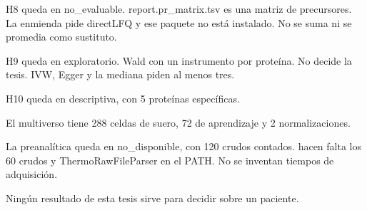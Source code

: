 H8 queda en no\_evaluable. report.pr\_matrix.tsv es una matriz de precursores. La enmienda pide directLFQ y ese paquete no está instalado. No se suma ni se promedia como sustituto.

H9 queda en exploratorio. Wald con un instrumento por proteína. No decide la tesis. IVW, Egger y la mediana piden al menos tres.

H10 queda en descriptiva, con 5 proteínas específicas.

El multiverso tiene 288 celdas de suero, 72 de aprendizaje y 2 normalizaciones.

La preanalítica queda en no\_disponible, con 120 crudos contados. hacen falta los 60 crudos y ThermoRawFileParser en el PATH. No se inventan tiempos de adquisición.

Ningún resultado de esta tesis sirve para decidir sobre un paciente.

